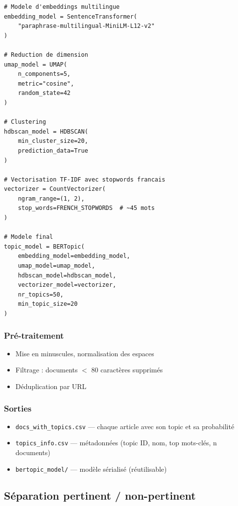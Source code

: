 \documentclass[12pt,a4paper]{report}
\newcommand{\code}[1]{\texttt{\small #1}}
\begin{document}
\begin{lstlisting}[language=Python3, caption={Initialisation de BERTopic (bertopic\_train\_save.py)}]
# Modele d'embeddings multilingue
embedding_model = SentenceTransformer(
    "paraphrase-multilingual-MiniLM-L12-v2"
)

# Reduction de dimension
umap_model = UMAP(
    n_components=5,
    metric="cosine",
    random_state=42
)

# Clustering
hdbscan_model = HDBSCAN(
    min_cluster_size=20,
    prediction_data=True
)

# Vectorisation TF-IDF avec stopwords francais
vectorizer = CountVectorizer(
    ngram_range=(1, 2),
    stop_words=FRENCH_STOPWORDS  # ~45 mots
)

# Modele final
topic_model = BERTopic(
    embedding_model=embedding_model,
    umap_model=umap_model,
    hdbscan_model=hdbscan_model,
    vectorizer_model=vectorizer,
    nr_topics=50,
    min_topic_size=20
)
\end{lstlisting}

\subsubsection{Pré-traitement}

\begin{itemize}
  \item Mise en minuscules, normalisation des espaces
  \item Filtrage : documents $<$ 80 caractères supprimés
  \item Déduplication par URL
\end{itemize}

\subsubsection{Sorties}

\begin{itemize}
  \item \code{docs\_with\_topics.csv} — chaque article avec son topic et sa probabilité
  \item \code{topics\_info.csv} — métadonnées (topic ID, nom, top mots-clés, n documents)
  \item \code{bertopic\_model/} — modèle sérialisé (réutilisable)
\end{itemize}

\subsection{Séparation pertinent / non-pertinent}
\end{document}
